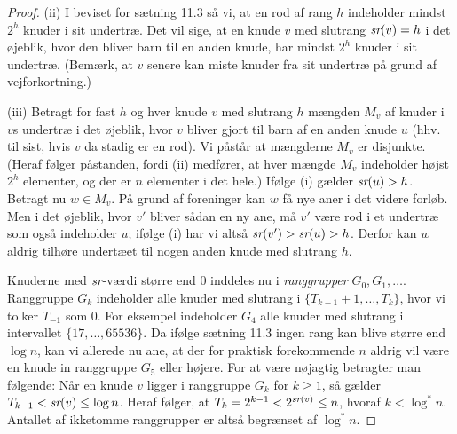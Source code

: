 \begin{proof}
  (ii)
  I beviset for sætning 11.3 så vi, at en rod af rang $h$ indeholder mindst $2^h$ knuder i sit undertræ. 
  Det vil sige, at en knude $v$ med slutrang $\operatorname{\emph{sr}}(v)= h$ i det øjeblik, hvor den bliver barn til en anden knude, har mindst $2^h$ knuder i sit undertræ.
  (Bemærk, at $v$ senere kan miste knuder fra sit undertræ på grund af vejforkortning.)

  (iii)
  Betragt for fast $h$ og hver knude $v$ med slutrang $h$ mængden $M_v$ af knuder i $v$s undertræ i det øjeblik, hvor $v$ bliver gjort til barn af en anden knude $u$ (hhv. til sist, hvis $v$ da stadig er en rod).
  Vi påstår at mængderne $M_v$ er disjunkte.
  (Heraf følger påstanden, fordi (ii) medfører, at hver mængde $M_v$ indeholder højst $2^h$ elementer, og der er $n$ elementer i det hele.)
  Ifølge (i) gælder $\operatorname{\emph{sr}}(u)>h$.
  Betragt nu $w\in M_v$.
  På grund af foreninger kan $w$ få nye aner i det videre forløb.
  Men i det øjeblik, hvor $v'$ bliver sådan en ny ane, må $v'$ være rod i et undertræ som også indeholder $u$; ifølge (i) har vi altså $\operatorname{\emph{sr}}(v')>\operatorname{\emph{sr}}(u)>h$.
  Derfor kan $w$ aldrig tilhøre undertæet til nogen anden knude med slutrang $h$.

\medskip
  Knuderne med $\operatorname{\emph{sr}}$-værdi større end $0$ inddeles nu i \emph{ranggrupper} $G_0,G_1,\ldots$.
  Ranggruppe $G_k$ indeholder alle knuder med slutrang i $\{T_{k-1}+1,\ldots, T_k\}$, hvor vi tolker $T_{-1}$ som $0$.
  For eksempel indeholder $G_4$ alle knuder med slutrang i intervallet $\{17,\ldots, 65536\}$.
  Da ifølge sætning 11.3 ingen rang kan blive større end $\log n$, kan vi allerede nu ane, at der for praktisk forekommende $n$ aldrig vil være en knude in ranggruppe $G_5$ eller højere. 
  For at være nøjagtig betragter man følgende:
  Når en knude $v$ ligger i ranggruppe $G_k$ for $k\geq 1$, så gælder 
  \( T_{k-1}<\operatorname{\emph{sr}}(v)\leq \log n\).
  Heraf følger, at 
  \( T_k = 2^{k-1} < 2^{\operatorname{\emph{sr}}(v)} \leq n\),
  hvoraf $k < \log^* n$.
  Antallet af ikketomme ranggrupper er altså begrænset af $\log^* n$.


\end{proof}
